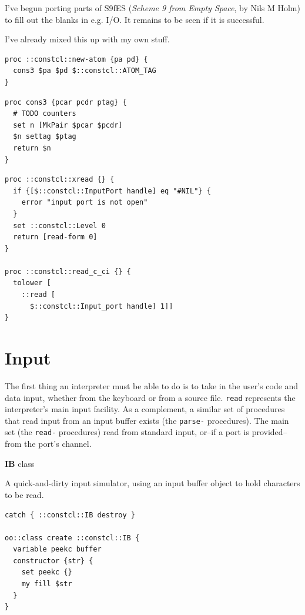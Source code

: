 \documentclass[twoside,9pt]{report}
\begin{document}
I've begun porting parts of S9fES (\emph{Scheme 9 from Empty Space}, by Nils M Holm) to fill out the blanks in e.g. I/O. It remains to be seen if it is successful.


I've already mixed this up with my own stuff.

\noindent\makebox[\linewidth]{\rule{\linewidth}{0.4pt}}
\begin{lstlisting}
proc ::constcl::new-atom {pa pd} {
  cons3 $pa $pd $::constcl::ATOM_TAG
}
\end{lstlisting}
\noindent\makebox[\linewidth]{\rule{\linewidth}{0.4pt}}
\noindent\makebox[\linewidth]{\rule{\linewidth}{0.4pt}}
\begin{lstlisting}
proc cons3 {pcar pcdr ptag} {
  # TODO counters
  set n [MkPair $pcar $pcdr]
  $n settag $ptag
  return $n
}
\end{lstlisting}
\noindent\makebox[\linewidth]{\rule{\linewidth}{0.4pt}}
\noindent\makebox[\linewidth]{\rule{\linewidth}{0.4pt}}
\begin{lstlisting}
proc ::constcl::xread {} {
  if {[$::constcl::InputPort handle] eq "#NIL"} {
    error "input port is not open"
  }
  set ::constcl::Level 0
  return [read-form 0]
}
 
proc ::constcl::read_c_ci {} {
  tolower [
    ::read [
      $::constcl::Input_port handle] 1]]
}
\end{lstlisting}
\noindent\makebox[\linewidth]{\rule{\linewidth}{0.4pt}}
\chapter{Input}
\label{input}

The first thing an interpreter must be able to do is to take in the user's code and data input, whether from the keyboard or from a source file. \texttt{read} represents the interpreter's main input facility. As a complement, a similar set of procedures that read input from an input buffer exists (the \texttt{parse-} procedures). The main set (the \texttt{read-} procedures) read from standard input, or--if a port is provided--from the port's channel.


\textbf{IB} class


A quick-and-dirty input simulator, using an input buffer object to hold characters to be read.

\noindent\makebox[\linewidth]{\rule{\linewidth}{0.4pt}}
\begin{lstlisting}
catch { ::constcl::IB destroy }
 
oo::class create ::constcl::IB {
  variable peekc buffer
  constructor {str} {
    set peekc {}
    my fill $str
  }
}
\end{lstlisting}
\noindent\makebox[\linewidth]{\rule{\linewidth}{0.4pt}}
\end{document}

